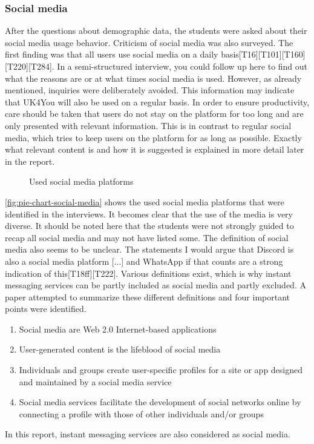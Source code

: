 \subsubsection{Social media}\label{sec:social-media}
After the questions about demographic data, the students were asked about their social media usage behavior.
Criticism of social media was also surveyed.
The first finding was that all users use social media on a daily basis[T16][T101][T160][T220][T284].
In a semi-structured interview, you could follow up here to find out what the reasons are or at what times social media is used.
However, as already mentioned, inquiries were deliberately avoided.
This information may indicate that UK4You will also be used on a regular basis.
In order to ensure productivity, care should be taken that users do not stay on the platform for too long and are only presented with relevant information.
This is in contrast to regular social media, which tries to keep users on the platform for as long as possible.
Exactly what relevant content is and how it is suggested is explained in more detail later in the report.\\

\begin{figure}[ht]
    \centering
    \caption{Used social media platforms}
    \label{fig:pie-chart-social-media}
\end{figure}

\autoref{fig:pie-chart-social-media} shows the used social media platforms that were identified in the interviews.
It becomes clear that the use of the media is very diverse.
It should be noted here that the students were not strongly guided to recap all social media and may not have listed some.
The definition of social media also seems to be unclear.
The statements \glqq I would argue that Discord is also a social media platform [...]\grqq{} and \glqq [...] WhatsApp if that counts\grqq{} are a strong indication of this[T18ff][T222].
Various definitions exist, which is why instant messaging services can be partly included as social media and partly excluded.
A paper attempted to summarize these different definitions and four important points were identified\cite{social-media-definition}.
\begin{enumerate}
    \item Social media are Web 2.0 Internet-based applications
    \item User-generated content is the lifeblood of social media
    \item Individuals and groups create user-specific profiles for a site or app designed and maintained by a social media service
    \item Social media services facilitate the development of social networks online by connecting a profile with those of other individuals and/or groups
\end{enumerate}
In this report, instant messaging services are also considered as social media.\\

